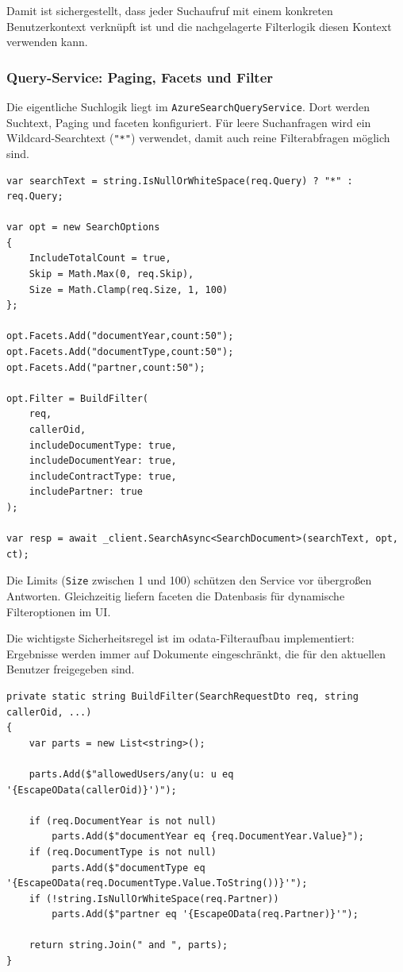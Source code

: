 Damit ist sichergestellt, dass jeder Suchaufruf mit einem konkreten Benutzerkontext verknüpft ist und die nachgelagerte Filterlogik diesen Kontext verwenden kann.

\subsubsection{Query-Service: Paging, Facets und Filter}

Die eigentliche Suchlogik liegt im \texttt{AzureSearchQueryService}. Dort werden Suchtext, Paging und \gls{facet}en konfiguriert. Für leere Suchanfragen wird ein Wildcard-Searchtext (\texttt{"*"}) verwendet, damit auch reine Filterabfragen möglich sind.

\begin{lstlisting}[language={[Sharp]C},caption={SearchOptions und Filteraufbau im Query-Service},label={lst:search-query-options}]
var searchText = string.IsNullOrWhiteSpace(req.Query) ? "*" : req.Query;

var opt = new SearchOptions
{
    IncludeTotalCount = true,
    Skip = Math.Max(0, req.Skip),
    Size = Math.Clamp(req.Size, 1, 100)
};

opt.Facets.Add("documentYear,count:50");
opt.Facets.Add("documentType,count:50");
opt.Facets.Add("partner,count:50");

opt.Filter = BuildFilter(
    req,
    callerOid,
    includeDocumentType: true,
    includeDocumentYear: true,
    includeContractType: true,
    includePartner: true
);

var resp = await _client.SearchAsync<SearchDocument>(searchText, opt, ct);
\end{lstlisting}

Die Limits (\texttt{Size} zwischen 1 und 100) schützen den Service vor übergroßen Antworten. Gleichzeitig liefern \gls{facet}en die Datenbasis für dynamische Filteroptionen im UI.

Die wichtigste Sicherheitsregel ist im \acrshort{odata}-Filteraufbau implementiert: Ergebnisse werden immer auf Dokumente eingeschränkt, die für den aktuellen Benutzer freigegeben sind.

\begin{lstlisting}[language={[Sharp]C},caption={Benutzerbezogener OData-Filter},label={lst:search-filter-acl}]
private static string BuildFilter(SearchRequestDto req, string callerOid, ...)
{
    var parts = new List<string>();

    parts.Add($"allowedUsers/any(u: u eq '{EscapeOData(callerOid)}')");

    if (req.DocumentYear is not null)
        parts.Add($"documentYear eq {req.DocumentYear.Value}");
    if (req.DocumentType is not null)
        parts.Add($"documentType eq '{EscapeOData(req.DocumentType.Value.ToString())}'");
    if (!string.IsNullOrWhiteSpace(req.Partner))
        parts.Add($"partner eq '{EscapeOData(req.Partner)}'");

    return string.Join(" and ", parts);
}
\end{lstlisting}

